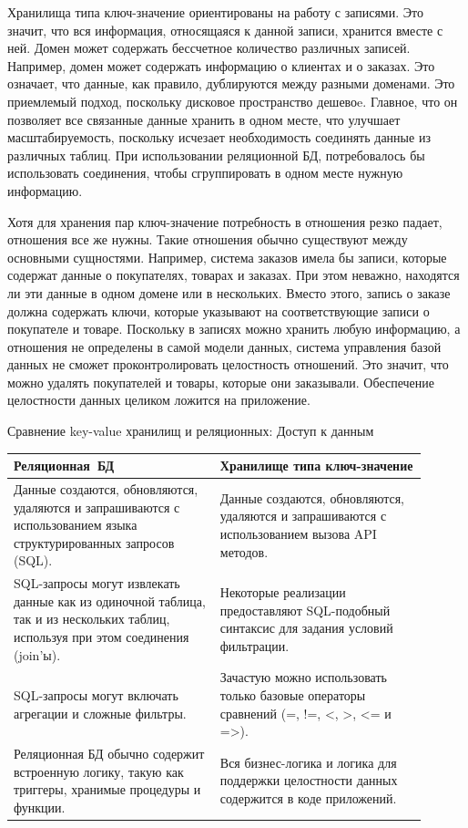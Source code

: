 \documentclass[specialist,subf,href,colorlinks=true
]{disser}
\begin{document}
Хранилища типа ключ-значение ориентированы на работу с записями. Это значит, что вся информация, относящаяся к данной записи, хранится вместе с ней. Домен  может содержать бессчетное количество различных записей. Например, домен может содержать информацию о клиентах и о заказах. Это означает, что данные, как правило, дублируются между разными доменами. Это приемлемый подход, поскольку дисковое пространство дешевоe. Главное, что он позволяет все связанные данные хранить в одном месте, что улучшает масштабируемость, поскольку исчезает необходимость соединять данные из различных таблиц. При использовании реляционной БД, потребовалось бы использовать соединения, чтобы сгруппировать в одном месте нужную информацию.

Хотя для хранения пар ключ-значение потребность в отношения резко падает, отношения все же нужны. Такие отношения обычно существуют между основными сущностями. Например, система заказов имела бы записи, которые содержат данные о покупателях, товарах и заказах. При этом неважно, находятся ли эти данные в одном домене или в нескольких. Вместо этого, запись о заказе должна содержать ключи, которые указывают на соответствующие записи о покупателе и товаре. Поскольку в записях можно хранить любую информацию, а отношения не определены в самой модели данных, система управления базой данных не сможет проконтролировать целостность отношений. Это значит, что можно удалять покупателей и товары, которые они заказывали. Обеспечение целостности данных целиком ложится на приложение.

Сравнение key-value хранилищ и реляционных:
Доступ к данным
\\\begin{tabular}{p{0.45\linewidth}|p{0.45\linewidth}}
\hline
Реляционная\ БД & Хранилище типа ключ-значение  \\
\hline
Данные создаются, обновляются, удаляются и запрашиваются с использованием языка структурированных запросов (SQL). &
Данные создаются, обновляются, удаляются и запрашиваются с использованием вызова API методов. \\
\hline
SQL-запросы могут извлекать данные как из одиночной таблица, так и из нескольких таблиц, используя при этом соединения (join’ы). &
Некоторые реализации предоставляют SQL-подобный синтаксис для задания условий фильтрации. \\
\hline
SQL-запросы могут включать агрегации и сложные фильтры. &
Зачастую можно использовать только базовые операторы сравнений (=, !=, <, >, <= и =>). \\
\hline
Реляционная БД обычно содержит встроенную логику, такую как триггеры, хранимые процедуры и функции. &
Вся бизнес-логика и логика для поддержки целостности данных содержится в коде приложений. \\
\hline
\end{tabular}
\end{document}
